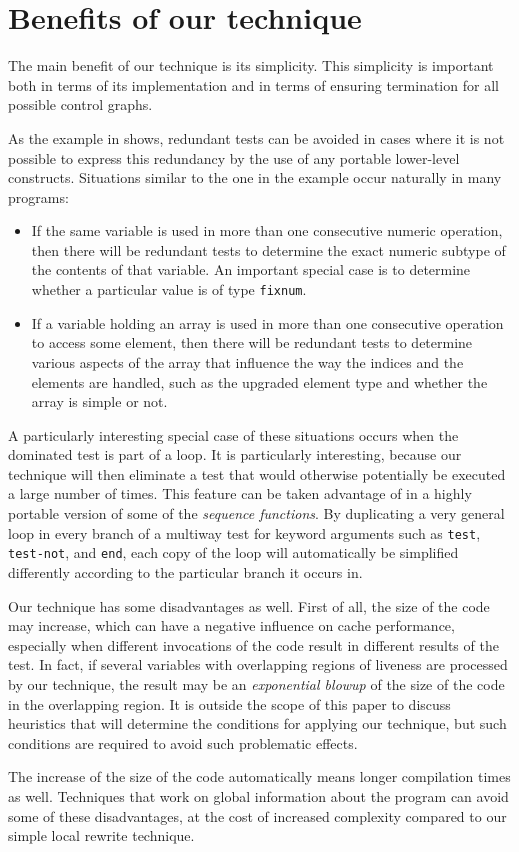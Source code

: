 \section{Benefits of our technique}

The main benefit of our technique is its simplicity.  This simplicity
is important both in terms of its implementation and in terms of
ensuring termination for all possible control graphs.

As the example in  shows, redundant
tests can be avoided in cases where it is not possible to express this
redundancy by the use of any portable lower-level constructs.
Situations similar to the one in the example occur naturally in many
programs:

\begin{itemize}
\item If the same variable is used in more than one consecutive
  numeric operation, then there will be redundant tests to determine
  the exact numeric subtype of the contents of that variable.  An
  important special case is to determine whether a particular value is
  of type \texttt{fixnum}.
\item If a variable holding an array is used in more than one
  consecutive operation to access some element, then there will be
  redundant tests to determine various aspects of the array that
  influence the way the indices and the elements are handled, such as
  the upgraded element type and whether the array is simple or not.
\end{itemize}

A particularly interesting special case of these situations occurs
when the dominated test is part of a loop.  It is particularly
interesting, because our technique will then eliminate a test that
would otherwise potentially be executed a large number of times.  This
feature can be taken advantage of in a highly portable version of some
of the \commonlisp{} \emph{sequence functions}.  By duplicating a very
general loop in every branch of a multiway test for keyword arguments
such as \texttt{test}, \texttt{test-not}, and \texttt{end}, each copy
of the loop will automatically be simplified differently according to
the particular branch it occurs in.

Our technique has some disadvantages as well.  First of all, the size
of the code may increase, which can have a negative influence on cache
performance, especially when different invocations of the code result
in different results of the test.  In fact, if several variables with
overlapping regions of liveness are processed by our technique, the
result may be an \emph{exponential blowup} of the size of the code in
the overlapping region.  It is outside the scope of this paper to
discuss heuristics that will determine the conditions for applying our
technique, but such conditions are required to avoid such problematic
effects.

The increase of the size of the code automatically means longer
compilation times as well.  Techniques that work on global information
about the program can avoid some of these disadvantages, at the cost
of increased complexity compared to our simple local rewrite
technique.
